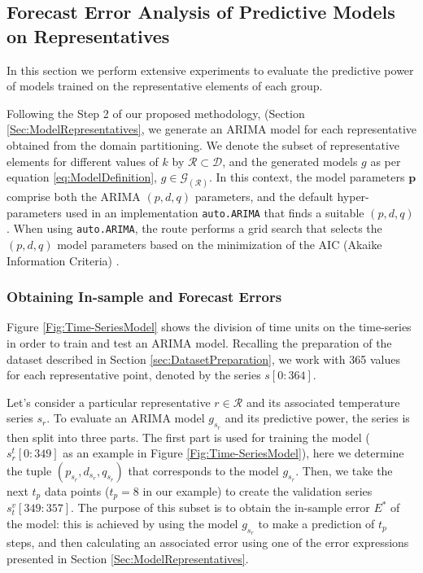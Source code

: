 \subsection{Forecast Error Analysis of Predictive Models on Representatives}
\label{Sec:AnalyzePredictorRepresentatives}

In this section we perform extensive experiments to evaluate the predictive power of models trained on the representative elements of each group. 

Following the Step 2 of our proposed methodology, (Section \ref{Sec:ModelRepresentatives}, we generate an ARIMA model for each representative obtained from the domain partitioning. We denote the subset of representative elements for different values of $k$ by $\mathcal{R} \subset \mathcal{D}$, and the generated models $g$ as per equation \ref{eq:ModelDefinition}, $g \in \mathcal{G}_{(\mathcal{R})}$. 
In this context, the model parameters $\mathbf{p}$ comprise both the ARIMA $(p, d, q)$ parameters, and the default hyper-parameters used in an implementation \texttt{auto.ARIMA} that finds a suitable $(p, d, q)$. When using \texttt{auto.ARIMA}, the route performs a grid search that selects the $(p, d, q)$ model parameters based on the minimization of the AIC (Akaike Information Criteria) \cite{Hyndman2008}.


\subsubsection{Obtaining In-sample and Forecast Errors}

Figure \ref{Fig:Time-SeriesModel} shows the division of time units on the time-series in order to train and test an ARIMA model. Recalling the preparation of the dataset described in Section \ref{sec:DatasetPreparation}, we work with 365 values for each representative point, denoted by the series $s[0:364]$.

Let's consider a particular representative $r \in \mathcal{R}$ and its associated temperature series $s_r$. To evaluate an ARIMA model $g_{s_r}$ and its predictive power, the series is then split into three parts. The first part is used for training the model ($s^t_r[0:349]$ as an example in Figure \ref{Fig:Time-SeriesModel}), here we determine the tuple $(p_{s_r}, d_{s_r}, q_{s_r})$ that corresponds to the model $g_{s_r}$. Then, we take the next $t_p$ data points ($t_p = 8$ in our example) to create the validation series $s^v_t[349:357]$. The purpose of this subset is to obtain the in-sample error ${E^*}$ of the model: this is achieved by using the model $g_{s_r}$ to make a prediction of $t_p$ steps, and then calculating an associated error using one of the error expressions presented in Section \ref{Sec:ModelRepresentatives}.

